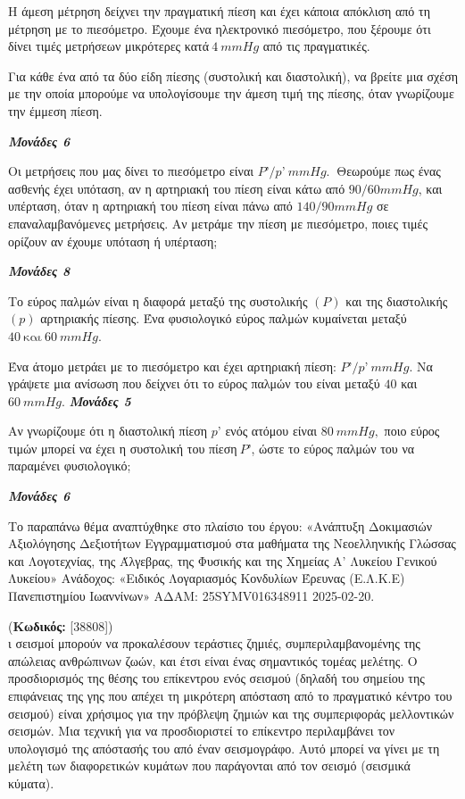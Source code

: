 \documentclass[11pt,a4paper,twoside]{book}
\newcounter{askhsh}[chapter]
\renewcommand{\theaskhsh}{
	\bf{\titlefont{\Large{\thechapter}}.\arabic{askhsh}}
}
\newcommand{\Askhsh}[2]{\refstepcounter{askhsh}{\titlefont{Άσκηση\theaskhsh} - \textcolor{maincolor}{ΘΕΜΑ #2}} (\small{\textbf{Κωδικός:} #1})\\}{}
\newcommand{\monades}[1]{
\hspace*{\fill}
\textbf{\textit{\textcolor{maincolor}{Μονάδες #1}}}}
\begin{document}
Η άμεση μέτρηση δείχνει την πραγματική πίεση και έχει κάποια απόκλιση από τη μέτρηση με το πιεσόμετρο. Έχουμε ένα ηλεκτρονικό πιεσόμετρο, που ξέρουμε ότι δίνει τιμές μετρήσεων μικρότερες κατά$\ 4\ mmHg$ από τις πραγματικές.

\begin{alist}
\item Για κάθε ένα από τα δύο είδη πίεσης (συστολική και διαστολική), να βρείτε μια σχέση με την οποία μπορούμε να υπολογίσουμε την άμεση τιμή της πίεσης, όταν γνωρίζουμε την έμμεση πίεση.
\monades{6}
\item Οι μετρήσεις που μας δίνει το πιεσόμετρο είναι $P’/p’\ \si{mmHg}.\ $ Θεωρούμε πως ένας ασθενής έχει υπόταση, αν η αρτηριακή του πίεση είναι κάτω από $90/60 \si{mmHg}$, και υπέρταση, όταν η αρτηριακή του πίεση είναι πάνω από $140/90 \si{mmHg}$ σε επαναλαμβανόμενες μετρήσεις. Αν μετράμε την πίεση με πιεσόμετρο, ποιες τιμές ορίζουν αν έχουμε υπόταση ή υπέρταση;

\monades{8}
\item Το εύρος παλμών είναι η διαφορά μεταξύ της συστολικής $(P)$ και της διαστολικής $(p)$ αρτηριακής πίεσης. Ένα φυσιολογικό εύρος παλμών κυμαίνεται μεταξύ $40\ \text{και}\ 60\ mmHg.$

\end{alist}
\begin{alist}
\item
  Ένα άτομο μετράει με το πιεσόμετρο και έχει αρτηριακή πίεση: $P’/p’\ \si{mmHg}.$ Να γράψετε μια ανίσωση που δείχνει ότι το εύρος παλμών του είναι μεταξύ $40$ και $60\ \si{mmHg}.$\monades{5}
\end{alist}
\begin{alist}
\item
  Αν γνωρίζουμε ότι η διαστολική πίεση $p’$ ενός ατόμου είναι $80\ mmHg,$ ποιο εύρος τιμών μπορεί να έχει η συστολική του πίεση$\ P’$, ώστε το εύρος παλμών του να παραμένει φυσιολογικό;
\monades{6}

{\footnotesize Το παραπάνω θέμα αναπτύχθηκε στο πλαίσιο του έργου: «Ανάπτυξη Δοκιμασιών Αξιολόγησης Δεξιοτήτων Εγγραμματισμού στα μαθήματα της Νεοελληνικής Γλώσσας και Λογοτεχνίας, της Άλγεβρας, της Φυσικής και της Χημείας Α' Λυκείου Γενικού Λυκείου» Ανάδοχος: «Ειδικός Λογαριασμός Κονδυλίων Έρευνας (Ε.Λ.Κ.Ε) Πανεπιστημίου Ιωαννίνων» ΑΔΑΜ: 25SYMV016348911 2025-02-20.}
\end{alist}

\vspace{4mm}

\Askhsh{[38808]}
Οι σεισμοί μπορούν να προκαλέσουν τεράστιες ζημιές, συμπεριλαμβανομένης της απώλειας ανθρώπινων ζωών, και έτσι είναι ένας σημαντικός τομέας μελέτης. Ο προσδιορισμός της θέσης του επίκεντρου ενός σεισμού (δηλαδή του σημείου της επιφάνειας της γης που απέχει τη μικρότερη απόσταση από το πραγματικό κέντρο του σεισμού) είναι χρήσιμος για την πρόβλεψη ζημιών και της συμπεριφοράς μελλοντικών σεισμών. Μια τεχνική για να προσδιοριστεί το επίκεντρο περιλαμβάνει τον υπολογισμό της απόστασής του από έναν σεισμογράφο. Αυτό μπορεί να γίνει με τη μελέτη των διαφορετικών κυμάτων που παράγονται από τον σεισμό (σεισμικά κύματα).
\end{document}
